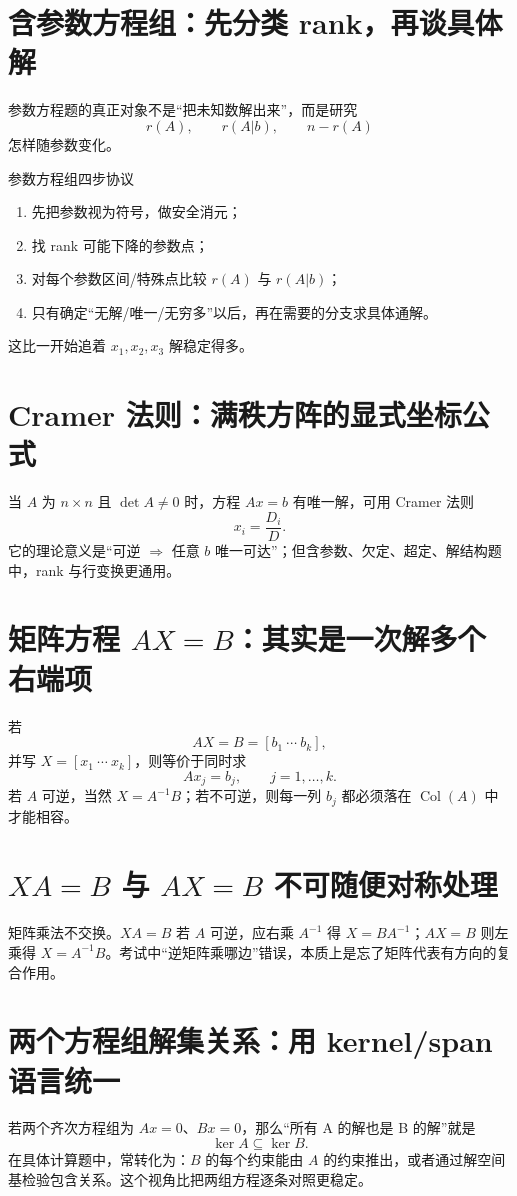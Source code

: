 \documentclass[11pt,a4paper,openany]{ctexbook}
\begin{document}
\section{含参数方程组：先分类 rank，再谈具体解}
参数方程题的真正对象不是“把未知数解出来”，而是研究
\[
r(A),\qquad r(A|b),\qquad n-r(A)
\]
怎样随参数变化。

\begin{methodbox}{参数方程组四步协议}
\begin{enumerate}
  \item 先把参数视为符号，做安全消元；
  \item 找 rank 可能下降的参数点；
  \item 对每个参数区间/特殊点比较 $r(A)$ 与 $r(A|b)$；
  \item 只有确定“无解/唯一/无穷多”以后，再在需要的分支求具体通解。
\end{enumerate}
这比一开始追着 $x_1,x_2,x_3$ 解稳定得多。
\end{methodbox}

\section{Cramer 法则：满秩方阵的显式坐标公式}
当 $A$ 为 $n\times n$ 且 $\det A\neq0$ 时，方程 $Ax=b$ 有唯一解，可用 Cramer 法则
\[
x_i=\frac{D_i}{D}.
\]
它的理论意义是“可逆 $\Rightarrow$ 任意 $b$ 唯一可达”；但含参数、欠定、超定、解结构题中，rank 与行变换更通用。

\section{矩阵方程 \texorpdfstring{$AX=B$}{AX=B}：其实是一次解多个右端项}
若
\[
AX=B=[b_1\ \cdots\ b_k],
\]
并写 $X=[x_1\ \cdots\ x_k]$，则等价于同时求
\[
Ax_j=b_j,\qquad j=1,\dots,k.
\]
若 $A$ 可逆，当然 $X=A^{-1}B$；若不可逆，则每一列 $b_j$ 都必须落在 $\operatorname{Col}(A)$ 中才能相容。

\section{\texorpdfstring{$XA=B$ 与 $AX=B$}{XA=B 与 AX=B} 不可随便对称处理}
矩阵乘法不交换。$XA=B$ 若 $A$ 可逆，应右乘 $A^{-1}$ 得 $X=BA^{-1}$；$AX=B$ 则左乘得 $X=A^{-1}B$。考试中“逆矩阵乘哪边”错误，本质上是忘了矩阵代表有方向的复合作用。

\section{两个方程组解集关系：用 kernel/span 语言统一}
若两个齐次方程组为 $Ax=0$、$Bx=0$，那么“所有 A 的解也是 B 的解”就是
\[
\ker A\subseteq\ker B.
\]
在具体计算题中，常转化为：$B$ 的每个约束能由 $A$ 的约束推出，或者通过解空间基检验包含关系。这个视角比把两组方程逐条对照更稳定。
\end{document}
